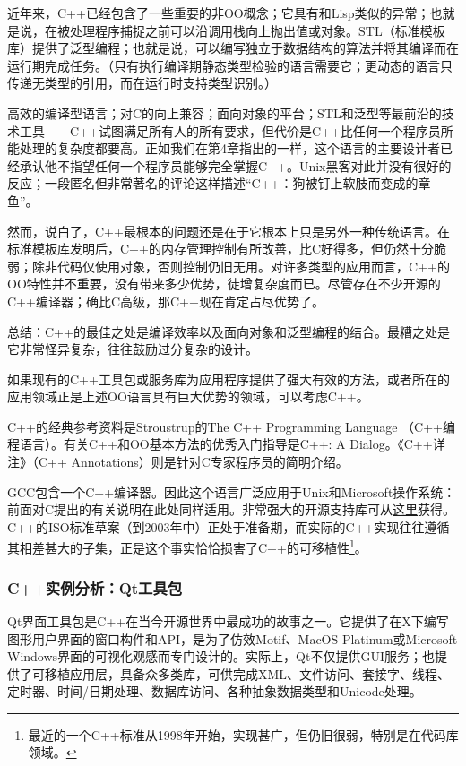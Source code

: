 \documentclass[12pt,oneside]{book}
\begin{document}
\begin{common-format}
近年来，C++已经包含了一些重要的非OO概念；它具有和Lisp类似的异常；也就是说，在被处理程序捕捉之前可以沿调用栈向上抛出值或对象。STL（标准模板库）提供了泛型编程；也就是说，可以编写独立于数据结构的算法并将其编译而在运行期完成任务。（只有执行编译期静态类型检验的语言需要它；更动态的语言只传递无类型的引用，而在运行时支持类型识别。）

高效的编译型语言；对C的向上兼容；面向对象的平台；STL和泛型等最前沿的技术工具——C++试图满足所有人的所有要求，但代价是C++比任何一个程序员所能处理的复杂度都要高。正如我们在第4章指出的一样，这个语言的主要设计者已经承认他不指望任何一个程序员能够完全掌握C++。Unix黑客对此并没有很好的反应；一段匿名但非常著名的评论这样描述“C++：狗被钉上软肢而变成的章鱼”。

然而，说白了，C++最根本的问题还是在于它根本上只是另外一种传统语言。在标准模板库发明后，C++的内存管理控制有所改善，比C好得多，但仍然十分脆弱；除非代码仅使用对象，否则控制仍旧无用。对许多类型的应用而言，C++的OO特性并不重要，没有带来多少优势，徒增复杂度而已。尽管存在不少开源的C++编译器；确比C高级，那C++现在肯定占尽优势了。

总结：C++的最佳之处是编译效率以及面向对象和泛型编程的结合。最糟之处是它非常怪异复杂，往往鼓励过分复杂的设计。

如果现有的C++工具包或服务库为应用程序提供了强大有效的方法，或者所在的应用领域正是上述OO语言具有巨大优势的领域，可以考虑C++。

C++的经典参考资料是Stroustrup的The C++ Programming Language （C++编程语言）\cite{Stroustrup}。有关C++和OO基本方法的优秀入门指导是C++: A Dialog\cite{Heller}。《C++详注》（C++ Annotations）\cite{Brokken}则是针对C专家程序员的简明介绍。

GCC包含一个C++编译器。因此这个语言广泛应用于Unix和Microsoft操作系统：前面对C提出的有关说明在此处同样适用。非常强大的开源支持库可从\href{http://www.boost.org/}{这里}获得。C++的ISO标准草案（到2003年中）正处于准备期，而实际的C++实现往往遵循其相差甚大的子集，正是这个事实恰恰损害了C++的可移植性\footnote{最近的一个C++标准从1998年开始，实现甚广，但仍旧很弱，特别是在代码库领域。}。

\subsubsection{C++实例分析：Qt工具包}
Qt界面工具包是C++在当今开源世界中最成功的故事之一。它提供了在X下编写图形用户界面的窗口构件和API，是为了仿效Motif、MacOS Platinum或Microsoft Windows界面的可视化观感而专门设计的。实际上，Qt不仅提供GUI服务；也提供了可移植应用层，具备众多类库，可供完成XML、文件访问、套接字、线程、定时器、时间/日期处理、数据库访问、各种抽象数据类型和Unicode处理。


\end{common-format}
\end{document}
